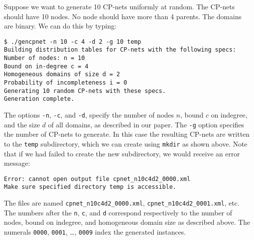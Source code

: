 \documentclass{article}
\begin{document}
Suppose we want to generate 10 CP-nets uniformly at random.  The
CP-nets should have 10 nodes.  No node should have more than 4
parents.  The domains are binary.  We can do this by typing:
\begin{verbatim}
$ ./gencpnet -n 10 -c 4 -d 2 -g 10 temp
Building distribution tables for CP-nets with the following specs:
Number of nodes: n = 10
Bound on in-degree c = 4
Homogeneous domains of size d = 2
Probability of incompleteness i = 0
Generating 10 random CP-nets with these specs.
Generation complete.
\end{verbatim}
The options 
\texttt{-n}, 
\texttt{-c}, 
and \texttt{-d}, 
specify the number of nodes $n$, bound $c$ on indegree, and the size
$d$ of all domains, as described in our paper.  The \texttt{-g} option 
specifies the number of CP-nets to generate.  In this case the
resulting CP-nets are written to the \texttt{temp} subdirectory, which
we can create using \texttt{mkdir} as shown above.
Note that if we had failed to create the new subdirectory, we would
receive an error message:
\begin{verbatim}
Error: cannot open output file cpnet_n10c4d2_0000.xml
Make sure specified directory temp is accessible.
\end{verbatim}
The files are named \verb|cpnet_n10c4d2_0000.xml|,
\verb|cpnet_n10c4d2_0001.xml|, etc.  The numbers after the \texttt{n},
\texttt{c}, and \texttt{d} correspond respectively to the number of
nodes, bound on indegree, and homogeneous domain size as described
above.  The numerals \texttt{0000}, \texttt{0001}, \ldots,
\texttt{0009} index the generated instances.
\end{document}
